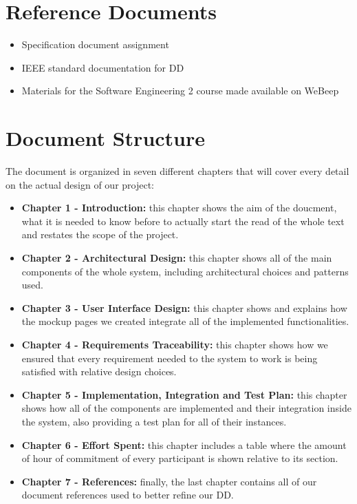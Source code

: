 \section{Reference Documents}
\begin{itemize}
	\item Specification document assignment
	\item IEEE standard documentation for DD
	\item Materials for the Software Engineering 2 course made available on WeBeep
\end{itemize}

\section{Document Structure}
The document is organized in seven different chapters that will cover every detail on the actual design of our project:
\begin{itemize}
	\item \textbf{Chapter 1 - Introduction:} this chapter shows the aim of the doucment, what it is needed to know before to actually start the read of the whole text and restates the scope of the project.
	\item \textbf{Chapter 2 - Architectural Design:} this chapter shows all of the main components of the whole system, including architectural choices and patterns used. 
	\item \textbf{Chapter 3 - User Interface Design:} this chapter shows and explains how the mockup pages we created integrate all of the implemented functionalities.  
	\item \textbf{Chapter 4 - Requirements Traceability:} this chapter shows how we ensured that every requirement needed to the system to work is being satisfied with relative design choices.
	\item \textbf{Chapter 5 - Implementation, Integration and Test Plan:} this chapter shows how all of the components are implemented and their integration inside the system, also providing a test plan for all of their instances.
	\item \textbf{Chapter 6 - Effort Spent:} this chapter includes a table where the amount of hour of commitment of every participant is shown relative to its section.
	\item \textbf{Chapter 7 - References:} finally, the last chapter contains all of our document references used to better refine our DD.
\end{itemize}